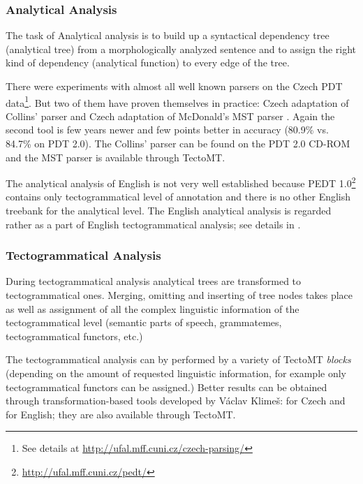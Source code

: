 \subsubsection{Analytical Analysis}

The task of Analytical analysis is to build up a syntactical dependency tree (analytical tree) from a morphologically analyzed sentence and to assign the right kind of dependency (analytical function) to every edge of the tree.


There were experiments with almost all well known parsers on the Czech PDT data\footnote{See details at \url{http://ufal.mff.cuni.cz/czech-parsing/}}. But two of them have proven themselves in practice: Czech adaptation of Collins' parser \citep{biblio:collinshbrt_1999} and Czech adaptation of McDonald's MST parser \citep{Novak:2007:FEM:1776334.1776350}. Again the second tool is few years newer and few points better in accuracy (80.9\% vs. 84.7\% on PDT 2.0\footnotemark[\value{footnote}]). The Collins' parser can be found on the PDT 2.0 CD-ROM and the MST parser is available through TectoMT.

The analytical analysis of English is not very well established because PEDT 1.0\footnote{\url{http://ufal.mff.cuni.cz/pedt/}} contains only tectogrammatical level of annotation and there is no other English treebank for the analytical level. The English analytical analysis is regarded rather as a part of English tectogrammatical analysis; see details in \citep{Klimes:2007:TTD:1776334.1776341}.



	
\subsubsection{Tectogrammatical Analysis}

During tectogrammatical analysis analytical trees are transformed to tectogrammatical ones. Merging, omitting and inserting of tree nodes takes place as well as assignment of all the complex linguistic information of the tectogrammatical level (semantic parts of speech, grammatemes, tectogrammatical functors, etc.)

The tectogrammatical analysis can by performed by a variety of TectoMT \emph{blocks} (depending on the amount of requested linguistic information, for example only tectogrammatical functors can be assigned.) Better results can be obtained through transformation-based tools developed by Václav Klimeš: \citep{biblio:KlTransformationBasedTectogrammatical2006} for Czech and \citep{Klimes:2007:TTD:1776334.1776341} for English; they are also available through TectoMT.


